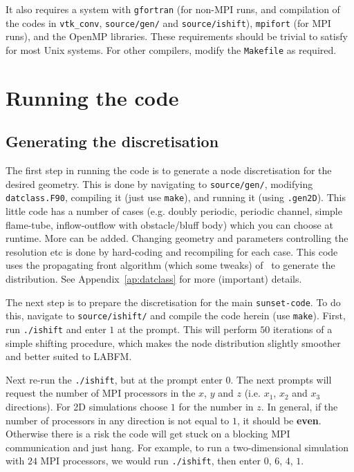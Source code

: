 \documentclass[notitlepage]{revtex4-1}
\begin{document}
It also requires a system with \verb|gfortran| (for non-MPI runs, and compilation of the codes in \verb|vtk_conv|, \verb|source/gen/| and \verb|source/ishift|), \verb|mpifort| (for MPI runs), and the OpenMP libraries. These requirements should be trivial to satisfy for most Unix systems. For other compilers, modify the \verb|Makefile| as required.

\section{Running the code}

\subsection{Generating the discretisation}

The first step in running the code is to generate a node discretisation for the desired geometry. This is done by navigating to \verb|source/gen/|, modifying \verb|datclass.F90|, compiling it (just use \verb|make|), and running it (using \verb|.gen2D|). This little code has a number of cases (e.g. doubly periodic, periodic channel, simple flame-tube, inflow-outflow with obstacle/bluff body) which you can choose at runtime. More can be added. Changing geometry and parameters controlling the resolution etc is done by hard-coding and recompiling for each case. This code uses the propagating front algorithm (which some tweaks) of~\cite{fornberg_2015a} to generate the distribution. See Appendix~\ref{ap:datclass} for more (important) details.


The next step is to prepare the discretisation for the main \verb|sunset-code|. To do this, navigate to \verb|source/ishift/| and compile the code herein (use \verb|make|). First, run \verb|./ishift| and enter $1$ at the prompt. This will perform $50$ iterations of a simple shifting procedure, which makes the node distribution slightly smoother and better suited to LABFM.

Next re-run the \verb|./ishift|, but at the prompt enter $0$. The next prompts will request the number of MPI processors in the $x$, $y$ and $z$ (i.e. $x_{1}$, $x_{2}$ and $x_{3}$ directions). For 2D simulations choose $1$ for the number in $z$. In general, if the number of processors in any direction is not equal to $1$, it should be \textbf{even}. Otherwise there is a risk the code will get stuck on a blocking MPI communication and just hang. For example, to run a two-dimensional simulation with $24$ MPI processors, we would run \verb|./ishift|, then enter $0$, $6$, $4$, $1$.
\end{document}
